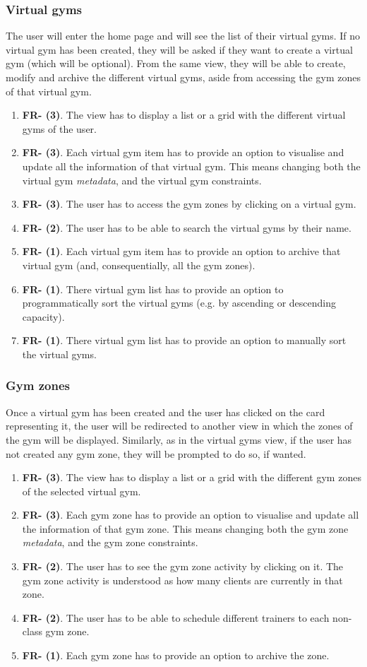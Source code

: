 \documentclass[a4paper, 12pt, oneside]{book}
\begin{document}
\subsubsection{Virtual gyms}
The user will enter the home page and will see the list of their virtual gyms. If no virtual gym has been created, they will be asked if they want to create a virtual gym (which will be optional). From the same view, they will be able to create, modify and archive the different virtual gyms, aside from accessing the gym zones of that virtual gym.
\begin{enumerate}[label = -]
	\item \textbf{FR- (3)}. The view has to display a list or a grid with the different virtual gyms of the user.
	\item \textbf{FR- (3)}. Each virtual gym item has to provide an option to visualise and update all the information of that virtual gym. This means changing both the virtual gym \emph{metadata}, and the virtual gym constraints.
	\item \textbf{FR- (3)}. The user has to access the gym zones by clicking on a virtual gym.
	\item \textbf{FR- (2)}. The user has to be able to search the virtual gyms by their name.
	\item \textbf{FR- (1)}. Each virtual gym item has to provide an option to archive that virtual gym (and, consequentially, all the gym zones).
	\item \textbf{FR- (1)}. There virtual gym list has to provide an option to programmatically sort the virtual gyms (e.g. by ascending or descending capacity).
	\item \textbf{FR- (1)}. There virtual gym list has to provide an option to manually sort the virtual gyms.
\end{enumerate}
\subsubsection{Gym zones}
Once a virtual gym has been created and the user has clicked on the card representing it, the user will be redirected to another view in which the zones of the gym will be displayed. Similarly, as in the virtual gyms view, if the user has not created any gym zone, they will be prompted to do so, if wanted.
\begin{enumerate}[label = -]
	\item \textbf{FR- (3)}. The view has to display a list or a grid with the different gym zones of the selected virtual gym.
	\item \textbf{FR- (3)}. Each gym zone has to provide an option to visualise and update all the information of that gym zone. This means changing both the gym zone \emph{metadata}, and the gym zone constraints.
	\item \textbf{FR- (2)}. The user has to see the gym zone activity by clicking on it. The gym zone activity is understood as how many clients are currently in that zone.
	\item \textbf{FR- (2)}. The user has to be able to schedule different trainers to each non-class gym zone.
	\item \textbf{FR- (1)}. Each gym zone has to provide an option to archive the zone.
\end{enumerate}
\end{document}
